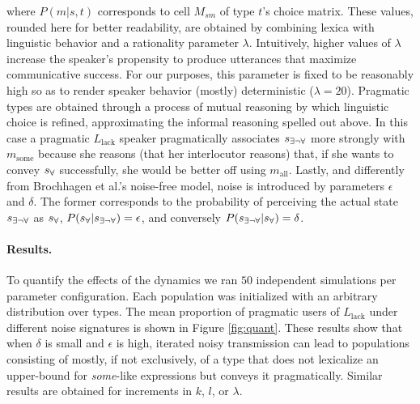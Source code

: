 \documentclass[10pt,a4paper]{article}
\newcommand{\state}{\ensuremath{s}\xspace}		%
\newcommand{\mystate}[1]{\ensuremath{\state_{\text{#1}}}\xspace} %
\newcommand{\messg}{\ensuremath{m}\xspace}		%
\newcommand{\mymessg}[1]{\ensuremath{\messg_{\text{#1}}}\xspace} %
\newcommand{\ssome}{\mystate{\ensuremath{\exists\neg\forall}}}
\newcommand{\sall}{\mystate{\ensuremath{\forall}}}
\newcommand{\msome}{\mymessg{some}}
\newcommand{\mall}{\mymessg{all}}
\begin{document}
where $P(m|s,t)$ corresponds to cell $M_{sm}$ of type $t$'s choice matrix. These values, rounded here for better readability, are obtained by combining lexica with linguistic behavior and a rationality parameter $\lambda$. Intuitively, higher values of $\lambda$ increase the speaker's propensity to produce utterances that maximize communicative success. For our purposes, this parameter is fixed to be reasonably high so as to render speaker behavior (mostly) deterministic ($\lambda = 20$). Pragmatic types are obtained through a process of mutual reasoning by which linguistic choice is refined, approximating the informal reasoning spelled out above. In this case a pragmatic $L_{\text{lack}}$ speaker pragmatically associates $\ssome$ more strongly with $\msome$ because she reasons (that her interlocutor reasons) that, if she wants to convey $\sall$ successfully, she would be better off using $\mall$. Lastly, and differently from Brochhagen et al.'s noise-free model, noise is introduced by parameters $\epsilon$ and $\delta$. The former corresponds to the probability of perceiving the actual state $\ssome$ as $\sall$, $P(\sall | \ssome) = \epsilon$, and conversely $P(\ssome | \sall) = \delta$.

\paragraph{Results.} To quantify the effects of the dynamics we ran $50$ independent
simulations per parameter configuration. Each population was initialized with an arbitrary
distribution over types. The mean proportion of pragmatic users of $L_{\text{lack}}$ under
different noise signatures is shown in Figure \ref{fig:quant}. These results show that when
$\delta$ is small and $\epsilon$ is high, iterated noisy transmission can lead to populations
consisting of mostly, if not exclusively, of a type that does not lexicalize an upper-bound for {\em some}-like expressions but conveys it pragmatically.  Similar results are obtained for
increments in $k$, $l$, or $\lambda$.
\end{document}
